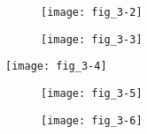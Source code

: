 \subsect{\lipsum*[21][13]}

\lipsum[31]

\sect{\lipsum*[22][1]}

\subsect{\lipsum*[22][2]}

\lipsum[27-32]

\begin{figure}[p]
   \centering
   \texttt{[image: fig\_3-2]}
   \caption[{\lipsum*[32][1]}]{\lipsum*[32][1-5]}
   \label{fig:fig_3-2}
\end{figure}

\subsect{\lipsum*[22][3]}

\lipsum[33-35]

\begin{figure}[p]
   \centering
   \texttt{[image: fig\_3-3]}
   \caption[{\lipsum*[33][1]}]{\lipsum*[33][1-5]}
   \label{fig:fig_3-3}
\end{figure}

\subsect{\lipsum*[22][4]}

\lipsum[36-37]

\begin{SCfigure}[\sidecaptionrelwidth][p]
   \centering
   \texttt{[image: fig\_3-4]}
   \caption[{\lipsum*[34][1]}]{\lipsum*[34][1-5]}
   \label{fig:fig_3-4}
\end{SCfigure}

\subsect{\lipsum*[22][5]}

\lipsum[38-40]

\begin{figure}[p]
   \centering
   \texttt{[image: fig\_3-5]}
   \caption[{\lipsum*[35][1]}]{\lipsum*[35][1-5]}
   \label{fig:fig_3-5}
\end{figure}

\subsect{\lipsum*[22][6]}

\lipsum[41-43]

\begin{figure}[p]
   \centering
   \texttt{[image: fig\_3-6]}
   \caption[{\lipsum*[36][1]}]{\lipsum*[36][1-2]}
   \label{fig:fig_3-6}
\end{figure}

